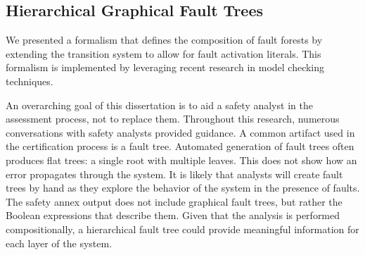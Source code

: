 \subsection{Hierarchical Graphical Fault Trees}
We presented a formalism that defines the composition of fault forests by extending the transition system to allow for fault activation literals. This formalism is implemented by leveraging recent research in model checking techniques. %

An overarching goal of this dissertation is to aid a safety analyst in the assessment process, not to replace them. Throughout this research, numerous conversations with safety analysts provided guidance.%
A common artifact used in the certification process is a fault tree. Automated generation of fault trees often produces flat trees: a single root with multiple leaves. This does not show how an error propagates through the system. It is likely that analysts will create fault trees by hand as they explore the behavior of the system in the presence of faults. The safety annex output does not include graphical fault trees, but rather the Boolean expressions that describe them. Given that the analysis is performed compositionally, a hierarchical fault tree could provide meaningful information for each layer of the system. 


